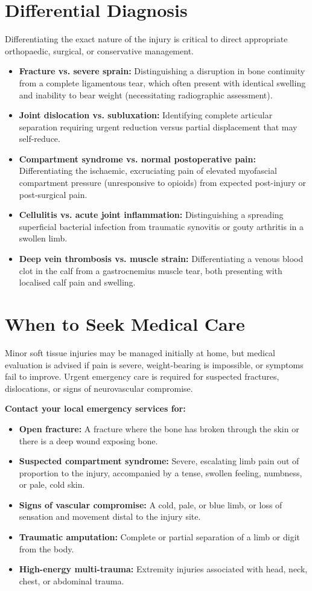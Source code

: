 \section*{Differential Diagnosis}
Differentiating the exact nature of the injury is critical to direct appropriate orthopaedic, surgical, or conservative management.
\begin{itemize}
    \item \textbf{Fracture vs. severe sprain:} Distinguishing a disruption in bone continuity from a complete ligamentous tear, which often present with identical swelling and inability to bear weight (necessitating radiographic assessment).
    \item \textbf{Joint dislocation vs. subluxation:} Identifying complete articular separation requiring urgent reduction versus partial displacement that may self-reduce.
    \item \textbf{Compartment syndrome vs. normal postoperative pain:} Differentiating the ischaemic, excruciating pain of elevated myofascial compartment pressure (unresponsive to opioids) from expected post-injury or post-surgical pain.
    \item \textbf{Cellulitis vs. acute joint inflammation:} Distinguishing a spreading superficial bacterial infection from traumatic synovitis or gouty arthritis in a swollen limb.
    \item \textbf{Deep vein thrombosis vs. muscle strain:} Differentiating a venous blood clot in the calf from a gastrocnemius muscle tear, both presenting with localised calf pain and swelling.
\end{itemize}

\section*{When to Seek Medical Care}
Minor soft tissue injuries may be managed initially at home, but medical evaluation is advised if pain is severe, weight-bearing is impossible, or symptoms fail to improve. Urgent emergency care is required for suspected fractures, dislocations, or signs of neurovascular compromise.

\textbf{Contact your local emergency services for:}
\begin{itemize}
    \item \textbf{Open fracture:} A fracture where the bone has broken through the skin or there is a deep wound exposing bone.
    \item \textbf{Suspected compartment syndrome:} Severe, escalating limb pain out of proportion to the injury, accompanied by a tense, swollen feeling, numbness, or pale, cold skin.
    \item \textbf{Signs of vascular compromise:} A cold, pale, or blue limb, or loss of sensation and movement distal to the injury site.
    \item \textbf{Traumatic amputation:} Complete or partial separation of a limb or digit from the body.
    \item \textbf{High-energy multi-trauma:} Extremity injuries associated with head, neck, chest, or abdominal trauma.
\end{itemize}

